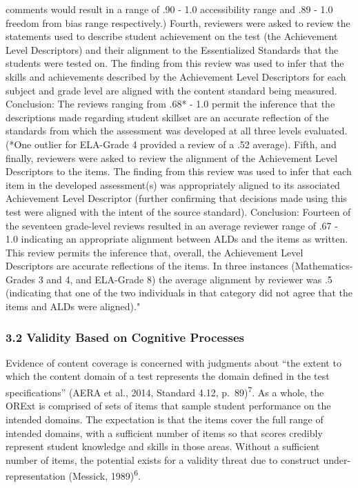 \documentclass[]{article}
\begin{document}
comments would result in a range of .90 - 1.0 accessibility range and
.89 - 1.0 freedom from bias range respectively.) Fourth, reviewers were
asked to review the statements used to describe student achievement on
the test (the Achievement Level Descriptors) and their alignment to the
Essentialized Standards that the students were tested on. The finding
from this review was used to infer that the skills and achievements
described by the Achievement Level Descriptors for each subject and
grade level are aligned with the content standard being measured.
Conclusion: The reviews ranging from .68* - 1.0 permit the inference
that the descriptions made regarding student skillset are an accurate
reflection of the standards from which the assessment was developed at
all three levels evaluated. (*One outlier for ELA-Grade 4 provided a
review of a .52 average). Fifth, and finally, reviewers were asked to
review the alignment of the Achievement Level Descriptors to the items.
The finding from this review was used to infer that each item in the
developed assessment(s) was appropriately aligned to its associated
Achievement Level Descriptor (further confirming that decisions made
using this test were aligned with the intent of the source standard).
Conclusion: Fourteen of the seventeen grade-level reviews resulted in an
average reviewer range of .67 - 1.0 indicating an appropriate alignment
between ALDs and the items as written. This review permits the inference
that, overall, the Achievement Level Descriptors are accurate
reflections of the items. In three instances (Mathematics-Grades 3 and
4, and ELA-Grade 8) the average alignment by reviewer was .5 (indicating
that one of the two individuals in that category did not agree that the
items and ALDs were aligned)."

\subsubsection{3.2 Validity Based on Cognitive
Processes}\label{validity-based-on-cognitive-processes}

Evidence of content coverage is concerned with judgments about ``the
extent to which the content domain of a test represents the domain
defined in the test specifications'' (AERA et al., 2014, Standard 4.12,
p.~89)\textsuperscript{7}. As a whole, the ORExt is comprised of sets of
items that sample student performance on the intended domains. The
expectation is that the items cover the full range of intended domains,
with a sufficient number of items so that scores credibly represent
student knowledge and skills in those areas. Without a sufficient number
of items, the potential exists for a validity threat due to construct
under-representation (Messick, 1989)\textsuperscript{6}.
\end{document}
